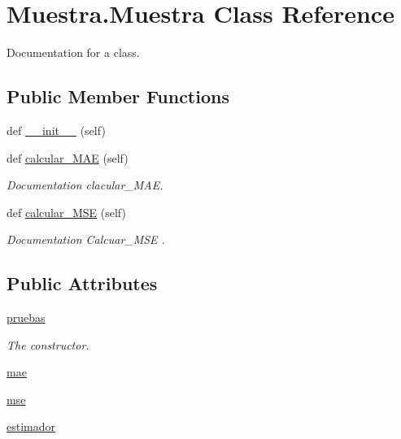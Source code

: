 \hypertarget{class_muestra_1_1_muestra}{}\section{Muestra.\+Muestra Class Reference}
\label{class_muestra_1_1_muestra}


Documentation for a class.  


\subsection*{Public Member Functions}
\begin{DoxyCompactItemize}
\item 
def \mbox{\hyperlink{class_muestra_1_1_muestra_a32851be663e08872a32e6a8ace2a3dbc}{\+\_\+\+\_\+init\+\_\+\+\_\+}} (self)
\item 
def \mbox{\hyperlink{class_muestra_1_1_muestra_a2bdfb143b9dcb7290be26a6bd84e72ec}{calcular\+\_\+\+M\+AE}} (self)
\begin{DoxyCompactList}\small\item\em Documentation clacular\+\_\+\+M\+AE. \end{DoxyCompactList}\item 
def \mbox{\hyperlink{class_muestra_1_1_muestra_a707ad436d9bf675784c9e9beec5be678}{calcular\+\_\+\+M\+SE}} (self)
\begin{DoxyCompactList}\small\item\em Documentation Calcuar\+\_\+\+M\+SE . \end{DoxyCompactList}\end{DoxyCompactItemize}
\subsection*{Public Attributes}
\begin{DoxyCompactItemize}
\item 
\mbox{\hyperlink{class_muestra_1_1_muestra_a8332ed8ec72e86e0edbfa22bed6f3828}{pruebas}}
\begin{DoxyCompactList}\small\item\em The constructor. \end{DoxyCompactList}\item 
\mbox{\hyperlink{class_muestra_1_1_muestra_ab0f909db1b6d6ece313843239809a416}{mae}}
\item 
\mbox{\hyperlink{class_muestra_1_1_muestra_aef455f777517629e914cab0adfc2bf90}{mse}}
\item 
\mbox{\hyperlink{class_muestra_1_1_muestra_abf776dce58d2e68ff0988d96d6f2fa1b}{estimador}}
\end{DoxyCompactItemize}


